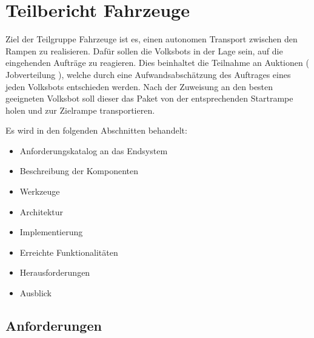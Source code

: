 \section{Teilbericht Fahrzeuge}

Ziel der Teilgruppe Fahrzeuge ist es, einen autonomen Transport zwischen den Rampen zu realisieren. Dafür sollen die Volksbots in der Lage sein, auf die eingehenden Aufträge zu reagieren.
Dies beinhaltet die Teilnahme an Auktionen ( Jobverteilung ), welche durch eine Aufwandsabschätzung des Auftrages eines jeden Volksbots entschieden werden. Nach der Zuweisung an den besten geeigneten Volksbot soll dieser das Paket von der entsprechenden Startrampe holen und zur Zielrampe transportieren.

Es wird in den folgenden Abschnitten behandelt:

\begin{itemize}
	\item Anforderungskatalog an das Endsystem
	\item Beschreibung der Komponenten
	\item Werkzeuge
	\item Architektur
	\item Implementierung
	\item Erreichte Funktionalitäten
	\item Herausforderungen
	\item Ausblick
\end{itemize} 

\subsection{Anforderungen}

